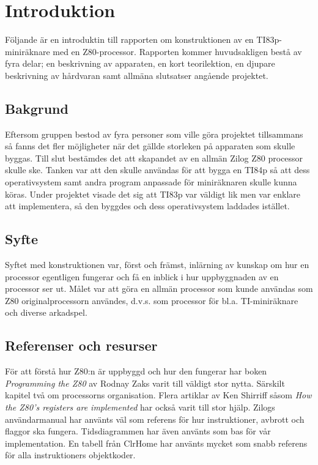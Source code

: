 \documentclass[main.tex]{subfiles}
\begin{document}
\section{Introduktion}
Följande är en introduktin till rapporten om konstruktionen av en
TI83p-miniräknare med en Z80-processor. Rapporten kommer huvudsakligen bestå av
fyra delar; en beskrivning av apparaten, en kort teorilektion, en djupare
beskrivning av hårdvaran samt allmäna slutsatser angående projektet.

\subsection{Bakgrund}
Eftersom gruppen bestod av fyra personer som ville göra projektet tillsammans
så fanns det fler möjligheter när det gällde storleken på apparaten som skulle
byggas. Till slut bestämdes det att skapandet av en allmän Zilog Z80 processor
skulle ske. Tanken var att den skulle användas för att bygga en TI84p så att
dess operativsystem samt andra program anpassade för miniräknaren skulle kunna
köras. Under projektet visade det sig att TI83p var väldigt lik men var enklare
att implementera, så den byggdes och dess operativsystem laddades istället.

\subsection{Syfte}
Syftet med konstruktionen var, först och främst, inlärning av kunskap om hur en
processor egentligen fungerar och få en inblick i hur uppbyggnaden av en
processor ser ut. Målet var att göra en allmän processor som kunde användas som
Z80 originalprocessorn användes, d.v.s. som processor för bl.a. TI-miniräknare
och diverse arkadspel.

\subsection{Referenser och resurser}
För att förstå hur Z80:n är uppbyggd och hur den fungerar har boken {\it
Programming the Z80} \cite{zaks-z80prog} av Rodnay Zaks varit till väldigt stor
nytta. Särskilt kapitel två om processorns organisation. Flera artiklar av Ken
Shirriff såsom {\it How the Z80's registers are implemented}
\cite{shirriff-reg} har också varit till stor hjälp. Zilogs användarmanual
\cite{z80um} har använts väl som referens för hur instruktioner, avbrott och
flaggor ska fungera. Tidsdiagrammen har även använts som bas för vår
implementation. En tabell från ClrHome \cite{clrhome} har använts mycket som
snabb referens för alla instruktioners objektkoder.
\end{document}
